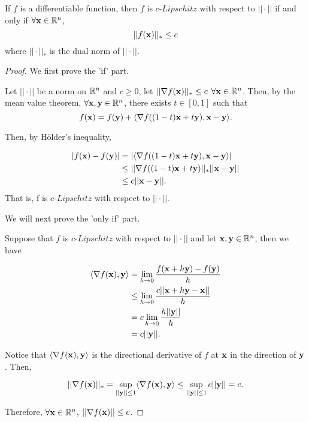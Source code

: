 \documentclass[main.tex]{subfiles}
\begin{document}
\begin{claim}
	If $f$ is a differentiable function, then $f$ is $c$-$Lipschitz$ with respect to $||\cdot||$ if and only if $\forall \mathbf{x} \in \mathbb{R}^n$,
		\begin{equation}
	||f(\mathbf{x})||_* \leq c
	\end{equation}
	where $||\cdot||_*$ is the dual norm of $||\cdot||$.
\end{claim}
\begin{proof}
	We first prove the 'if' part.
	
	Let $||\cdot||$ be a norm on $\mathbb{R}^n$ and $c \geq 0$, let $||\nabla f(\mathbf{x})||_* \leq c $ $\forall \mathbf{x} \in \mathbb{R}^n$. Then, by the mean value theorem, $\forall \mathbf{x}, \mathbf{y} \in\mathbb{R}^n$, there exists $t\in [0,1]$ such that 
	\begin{equation*}
		f(\mathbf{x}) = f(\mathbf{y}) + \langle \nabla f((1-t) \mathbf{x} + t \mathbf{y}) , \mathbf{x} - \mathbf{y} \rangle.
	\end{equation*}
	
	Then, by H\"older's inequality, 
	
	\begin{equation*}
		\begin{aligned}
				|f(\mathbf{x}) - f(\mathbf{y})| & = |\langle \nabla f((1-t) \mathbf{x} + t \mathbf{y}) , \mathbf{x} - \mathbf{y} \rangle| \\
								  & \leq ||\nabla f((1-t) \mathbf{x} + t \mathbf{y})||_* ||\mathbf{x} - \mathbf{y}|| \\
								  & \leq c ||\mathbf{x} - \mathbf{y}||.
		\end{aligned}
	\end{equation*}
	That is, f is $c$-$Lipschitz$ with respect to $||\cdot||$.
	
	We will next prove the 'only if' part.
	
	Suppose that $f$ is $c$-$Lipschitz$ with respect to $||\cdot||$ and let $\mathbf{x}, \mathbf{y} \in \mathbb{R}^n$, then we have 
	
	\begin{equation*}
		\begin{aligned}
			\langle \nabla f(\mathbf{x}) , \mathbf{y} \rangle &= \lim\limits_{h \to 0} \frac{f(\mathbf{x} + h\mathbf{y}) - f(\mathbf{y})}{h} \\
												&\leq \lim\limits_{h \to 0} \frac{c||\mathbf{x} + h\mathbf{y} - \mathbf{x}||}{h} \\
												& = c \lim\limits_{h \to 0} \frac{h||\mathbf{y}||}{h} \\
												& = c||\mathbf{y}||.
		\end{aligned}
	\end{equation*}
	
	Notice that $\langle \nabla f(\mathbf{x}) , \mathbf{y} \rangle$ is the directional derivative of $f$ at $\mathbf{x}$ in the direction of $\mathbf{y}$. Then,
	
	\begin{equation*}
		||\nabla f(\mathbf{x})||_* = \sup\limits_{||\mathbf{y}||\leq 1} \langle \nabla f(\mathbf{x}) , \mathbf{y} \rangle \leq \sup\limits_{||\mathbf{y}||\leq 1}  c||\mathbf{y}|| = c.
	\end{equation*}
	
	Therefore, $\forall \mathbf{x} \in \mathbb{R}^n$, $||\nabla f(\mathbf{x})|| \leq c$.
\end{proof}
\end{document}
